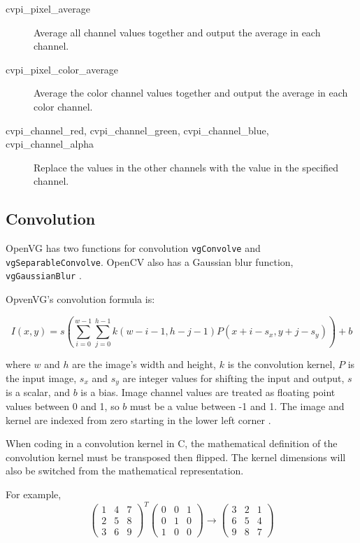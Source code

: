 \documentclass[12pt]{report}
\begin{document}
\begin{description}
\item[{cvpi\_pixel\_average}] Average all channel values together and
output the average in each channel.
\item[{cvpi\_pixel\_color\_average}] Average the color channel values together and
output the average in each color channel.
\item [{cvpi\_channel\_red}, {cvpi\_channel\_green}, {cvpi\_channel\_blue},
  {cvpi\_channel\_alpha}] Replace the values in the other
channels with the value in the specified channel.
\end{description}

\subsection{Convolution}
\label{sec-3-1-4}
OpenVG has two functions for convolution {\tt vgConvolve} and {\tt
  vgSeparableConvolve}. OpenCV also has a Gaussian blur function,
{\tt vgGaussianBlur} \cite{openvg}.

OpvenVG's convolution formula is:

\[I(x,y)=s\left( \sum_{i=0}^{w-1}\sum_{j=0}^{h-1}k(w-i-1,h-j-1)P(x+i-s_x,y+j-s_y)\right) +b\]

where $w$ and $h$ are the image's width and height, $k$ is the
convolution kernel, $P$ is the input image, $s_x$ and $s_y$ are
integer values for shifting the input and output, $s$ is a scalar, and
$b$ is a bias. Image channel values are treated
as floating point values between 0 and 1, so $b$ must be a value
between -1 and 1. The image and kernel are indexed from zero starting in the
lower left corner \cite[pp.~177-180]{openvg}.

When coding in a convolution kernel in C, the
mathematical definition of the convolution kernel must be
transposed then flipped. The kernel dimensions will also be
switched from the mathematical representation.

For example,
   \[\begin{pmatrix} 1 & 4 & 7 \\ 2 & 5 & 8 \\ 3 & 6 & 9 \end{pmatrix}^T
          \begin{pmatrix} 0 & 0 &
 1 \\ 0 & 1 &
      0 \\ 1 & 0 & 0 \end{pmatrix} \to \begin{pmatrix} 3 & 2 & 1 \\ 6 & 5 & 4 \\ 9 & 8 & 7 \end{pmatrix}
\]
\end{document}
